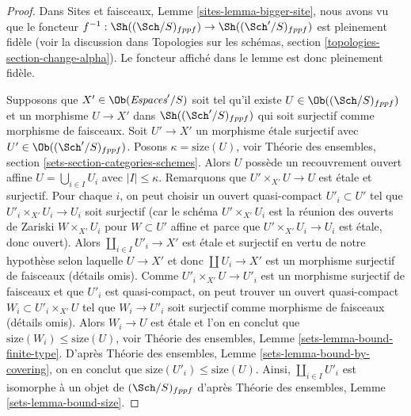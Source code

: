 \begin{proof}
Dans Sites et faisceaux, Lemme \ref{sites-lemma-bigger-site}, nous avons vu que le foncteur
$f^{-1} : \Sh((\Sch/S)_{fppf}) \to \Sh((\Sch'/S)_{fppf})$
est pleinement fidèle (voir la discussion dans
Topologies sur les schémas, section \ref{topologies-section-change-alpha}).
Le foncteur affiché dans le lemme est donc pleinement fidèle.

\medskip\noindent
Supposons que $X' \in \Ob(\textit{Espaces}'/S)$ soit tel qu'il existe
$U \in \Ob((\Sch/S)_{fppf})$ et un morphisme $U \to X'$ dans
$\Sh((\Sch'/S)_{fppf})$ qui soit surjectif comme morphisme de faisceaux.
Soit $U' \to X'$ un morphisme \'etale surjectif avec
$U' \in \Ob((\Sch'/S)_{fppf})$. Posons $\kappa = \text{size}(U)$, voir
Théorie des ensembles, section \ref{sets-section-categories-schemes}.
Alors $U$ possède un recouvrement ouvert affine $U = \bigcup_{i \in I} U_i$
avec $|I| \leq \kappa$. Remarquons que $U' \times_{X'} U \to U$ est \'etale
et surjectif. Pour chaque $i$, on peut choisir un ouvert quasi-compact
$U'_i \subset U'$ tel que $U'_i \times_{X'} U_i \to U_i$
soit surjectif (car le schéma $U' \times_{X'} U_i$ est la
réunion des ouverts de Zariski $W \times_{X'} U_i$ pour $W \subset U'$
affine et parce que $U' \times_{X'} U_i \to U_i$ est \'etale, donc ouvert).
Alors $\coprod_{i \in I} U'_i \to X'$ est \'etale et surjectif
en vertu de notre hypothèse selon laquelle $U \to X'$ et donc $\coprod U_i \to X'$
est un morphisme surjectif de faisceaux (détails omis).
Comme $U'_i \times_{X'} U \to U'_i$ est un morphisme surjectif de faisceaux
et que $U'_i$ est quasi-compact,
on peut trouver un ouvert quasi-compact $W_i \subset U'_i \times_{X'} U$
tel que $W_i \to U'_i$ soit surjectif comme morphisme de faisceaux
(détails omis). Alors $W_i \to U$ est \'etale et l'on en conclut
que $\text{size}(W_i) \leq \text{size}(U)$, voir
Théorie des ensembles, Lemme \ref{sets-lemma-bound-finite-type}. D'après
Théorie des ensembles, Lemme \ref{sets-lemma-bound-by-covering}, on en conclut
que $\text{size}(U'_i) \leq \text{size}(U)$.
Ainsi, $\coprod_{i \in I} U'_i$ est isomorphe à un objet de
$(\Sch/S)_{fppf}$ d'après Théorie des ensembles, Lemme \ref{sets-lemma-bound-size}.


\end{proof}
